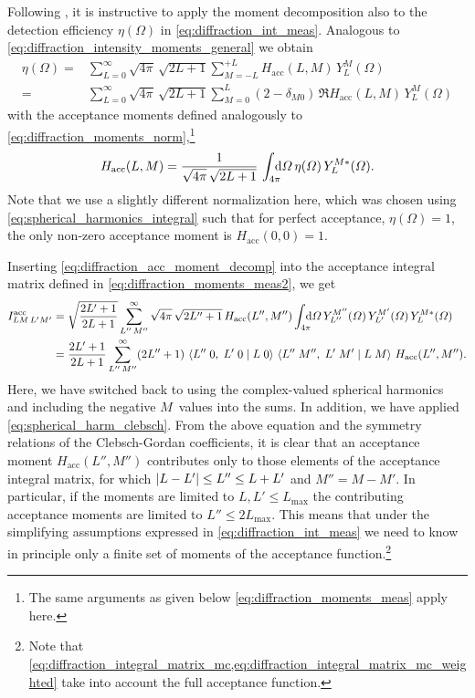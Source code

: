 Following , it is instructive to apply the
moment decomposition also to the detection efficiency $\eta(\Omega)$
in \cref{eq:diffraction_int_meas}.  Analogous to
\cref{eq:diffraction_intensity_moments_general} we obtain
\begin{align}
  \label{eq:diffraction_acc_moment_decomp}
  \eta(\Omega)
  ={}& \sum_{L = 0}^\infty \sqrt{4 \pi}\, \sqrt{2 L + 1} \sum_{M = -L}^{+L} H_\text{acc}(L, M)\, Y_L^M(\Omega)
  \\
  ={}& \sum_{L = 0}^\infty \sqrt{4 \pi}\, \sqrt{2 L + 1} \sum_{M = 0}^{L} (2 - \delta_{M 0})\, \Re{H_\text{acc}(L, M)\, Y_L^M(\Omega)}
\end{align}
with the acceptance moments defined analogously to
\cref{eq:diffraction_moments_norm},\footnote{The same arguments as
given below \cref{eq:diffraction_moments_meas} apply here.} \ie
\begin{equation}
  \label{eq:diffraction_acc_moment}
  H_\text{acc}(L, M)
  = \frac{1}{\sqrt{4 \pi}\, \sqrt{2 L + 1}}\, \int_{4 \pi}\!\!\!\! \dif{\Omega}\, \eta(\Omega)\, Y_L^{M *}(\Omega).
\end{equation}
Note that we use a slightly different normalization here, which was
chosen using \cref{eq:spherical_harmonics_integral} such that for
perfect acceptance, \ie $\eta(\Omega) = 1$, the only non-zero
acceptance moment is $H_\text{acc}(0, 0) = 1$.%

Inserting \cref{eq:diffraction_acc_moment_decomp} into the acceptance
integral matrix defined in \cref{eq:diffraction_moments_meas2}, we get
\begin{align}
  I^\text{acc}_{L M\, L' M'}
  ={}& \sqrt{\frac{2 L' + 1}{2 L + 1}} \sum_{L''\, M''}^\infty \sqrt{4 \pi}\, \sqrt{2 L'' + 1}\, H_\text{acc}(L'', M'')
  \int_{4 \pi}\!\!\!\! \dif{\Omega}\, Y_{L''}^{M''}(\Omega)\, Y_{L'}^{M'}(\Omega)\, Y_L^{M *}(\Omega) \nonumber
  \\
  \label{eq:diffraction_acc_int_moment_decomp}
  ={}& \frac{2 L' + 1}{2 L + 1} \sum_{L''\, M''}^\infty (2 L'' + 1)\,
  \clebsch{L''}{0}{L'}{0}{L}{0}\, \clebsch{L''}{M''}{L'}{M'}{L}{M}\, H_\text{acc}(L'', M'').
\end{align}
Here, we have switched back to using the complex-valued spherical
harmonics and including the negative $M$~values into the sums.  In
addition, we have applied \cref{eq:spherical_harm_clebsch}.
From the above equation and the symmetry relations of the
Clebsch-Gordan coefficients, it is clear that an acceptance moment
$H_\text{acc}(L'', M'')$ contributes only to those elements of the
acceptance integral matrix, for which $\vert{L - L'}\vert \leq L'' \leq L +
L'$ and $M'' = M - M'$.  In particular, if the moments are limited to
$L, L' \leq L_\text{max}$ the contributing acceptance moments are
limited to $L'' \leq 2 L_\text{max}$.  This means that under the
simplifying assumptions expressed in \cref{eq:diffraction_int_meas} we
need to know in principle only a finite set of moments of the
acceptance function.\footnote{Note that
\cref{eq:diffraction_integral_matrix_mc,eq:diffraction_integral_matrix_mc_weighted}
take into account the full acceptance function.}



